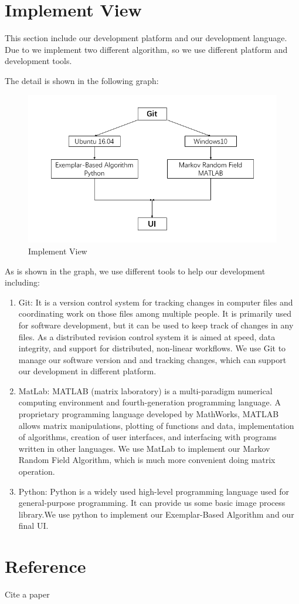 \documentclass[12pt]{article}
\begin{document}
\section{Implement View}
\qquad This section include our development platform and our development language. Due to we implement two different algorithm, so we use different platform and development tools.

The detail is shown in the following graph:
\begin{figure}[H]
	\centering
	\includegraphics[width=1.0\linewidth]{implement.jpg}
	\caption{Implement View}
\end{figure}
As is shown in the graph, we use different tools to help our development including:
\begin{enumerate}
	\item Git: It is a version control system for tracking changes in computer files and coordinating work on those files among multiple people. It is primarily used for software development, but it can be used to keep track of changes in any files. As a distributed revision control system it is aimed at speed, data integrity, and support for distributed, non-linear workflows. We use Git to manage our software version and and tracking changes, which can support our development in different platform.
	\item MatLab: MATLAB (matrix laboratory) is a multi-paradigm numerical computing environment and fourth-generation programming language. A proprietary programming language developed by MathWorks, MATLAB allows matrix manipulations, plotting of functions and data, implementation of algorithms, creation of user interfaces, and interfacing with programs written in other languages. We use MatLab to implement our Markov Random Field Algorithm, which is much more convenient doing matrix operation.
	\item Python: Python is a widely used high-level programming language used for general-purpose programming. It can provide us some basic image process library.We use python to implement our Exemplar-Based Algorithm and our final UI.
\end{enumerate}
\section{Reference}


\newpage
Cite a paper\cite{DBLP:conf/siggraph/BertalmioSCB00}


\end{document}
